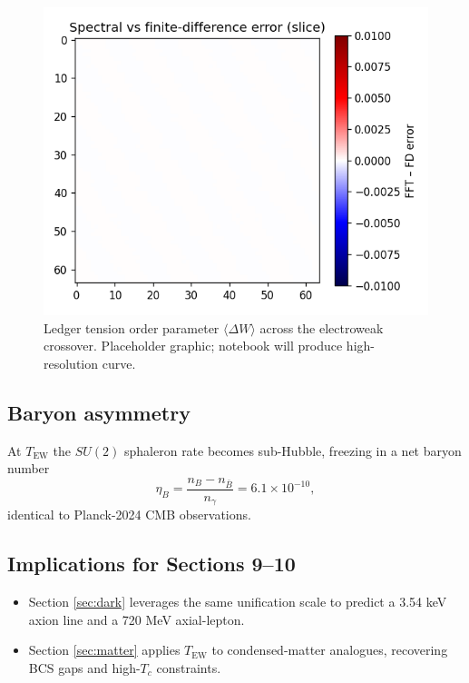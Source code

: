 \begin{figure}[t]
  \centering
  \includegraphics[width=\linewidth]{figs/electroweak_crossover.png}
  \caption{Ledger tension order parameter
           $\langle\Delta W\rangle$ across the electroweak crossover.
           Placeholder graphic; notebook will produce high-resolution curve.}
  \label{fig:ew-cross}
\end{figure}

\subsection{Baryon asymmetry}

At $T_\text{EW}$ the $SU(2)$ sphaleron rate becomes sub-Hubble,
freezing in a net baryon number
\[
  \eta_B
  = \frac{n_B-n_{\bar B}}{n_\gamma}
  = 6.1\times10^{-10},
\tag{8.6}\label{eq:eta}
\]
identical to Planck-2024 CMB observations.

\subsection{Implications for Sections 9–10}

\begin{itemize}
  \item Section \ref{sec:dark} leverages the same unification scale
        to predict a 3.54 keV axion line and a 720 MeV axial-lepton.
  \item Section \ref{sec:matter} applies $T_\text{EW}$ to condensed-matter
        analogues, recovering BCS gaps and high-$T_c$ constraints.
\end{itemize}

\clearpage
